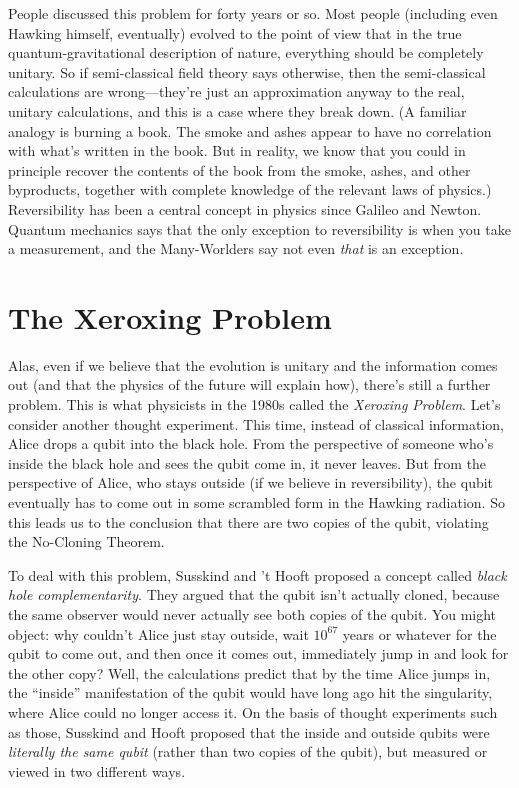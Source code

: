 \documentclass[12pt]{report}
\theoremstyle{plain}
\theoremstyle{definition}
\begin{document}
People discussed this problem for forty years or so.
Most people (including even Hawking himself, eventually) evolved to the point of view that in the true quantum-gravitational description of nature, everything should be
completely unitary. So if semi-classical field theory says otherwise, then
the semi-classical calculations are wrong---they're just an approximation anyway
to the real, unitary calculations, and this is a case where
they break down.
(A familiar analogy is burning a book. The smoke and ashes appear to have
no correlation with what's written in the book.  But
in reality, we know that you could in principle recover the contents of
the book from the smoke, ashes, and other byproducts, together with complete knowledge of the relevant laws of physics.)
Reversibility has been a central concept in physics since Galileo and Newton.  Quantum mechanics says that the only exception to reversibility
is when you take a measurement, and the Many-Worlders say
not even {\em that} is an exception.

\section{The Xeroxing Problem}

Alas, even if we believe that the evolution is unitary and the information comes out (and that the physics of the future will explain how),
there's still a further problem.
This is what physicists in the 1980s called
the {\em Xeroxing  Problem}.
Let's consider another thought experiment.
This time, instead of classical information, Alice drops a qubit into the
black hole.
From the perspective of someone who's inside the black hole and sees the qubit come in, it never
leaves.  But from the perspective of Alice, who stays outside
(if we believe in reversibility), the qubit
eventually has to come out in some scrambled form in the Hawking radiation.
So this leads us to the conclusion that there are
two copies of the qubit, violating the No-Cloning Theorem.

To deal with this problem, Susskind and 't Hooft proposed a concept called {\it black hole complementarity}.
They argued that the qubit isn't actually cloned, because the same observer
would never actually see both copies of the qubit.  You might object: why couldn't Alice just stay outside, wait $10^{67}$ years
or whatever for the qubit to come out, and then once it comes out, immediately
jump in and look for the other copy?
Well, the calculations predict that by the time Alice jumps in, the ``inside'' manifestation of the qubit
would have long ago hit the singularity, where Alice could no longer access it.
On the basis of thought experiments such as those, Susskind and Hooft proposed that the inside and outside qubits were
{\em literally the same qubit} (rather than two copies of the qubit), but measured or viewed in two different ways.
\end{document}
